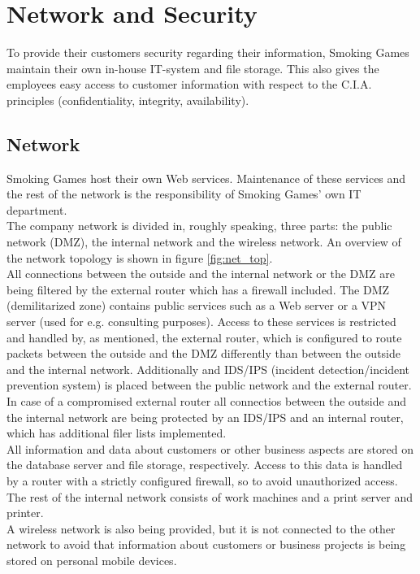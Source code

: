 \newpage
\section{Network and Security}
To provide their customers security regarding their information, Smoking Games maintain their own in-house IT-system and file storage. This also gives the employees easy access to customer information with respect to the C.I.A. principles (confidentiality, integrity, availability).
\subsection{Network}
Smoking Games host their own Web services. Maintenance of these services and the rest of the network is the responsibility of Smoking Games' own IT department.\\
The company network is divided in, roughly speaking, three parts: the public network (DMZ), the internal network and the wireless network. An overview of the network topology is shown in figure \ref{fig:net_top}.\\
All connections between the outside and the internal network or the DMZ are being filtered by the external router which has a firewall included. The DMZ (demilitarized zone) contains public services such as a Web server or a VPN server (used for e.g. consulting purposes). Access to these services is restricted and handled by, as mentioned, the external router, which is configured to route packets between the outside and the DMZ differently than between the outside and the internal network. Additionally and IDS/IPS (incident detection/incident prevention system) is placed between the public network and the external router.\\
In case of a compromised external router all connectios between the outside and the internal network are being protected by an IDS/IPS and an internal router, which has additional filer lists implemented.\\
All information and data about customers or other business aspects are stored on the database server and file storage, respectively. Access to this data is handled by a router with a strictly configured firewall, so to avoid unauthorized access.\\
The rest of the internal network consists of work machines and a print server and printer.\\
A wireless network is also being provided, but it is not connected to the other network to avoid that information about customers or business projects is being stored on personal mobile devices.
